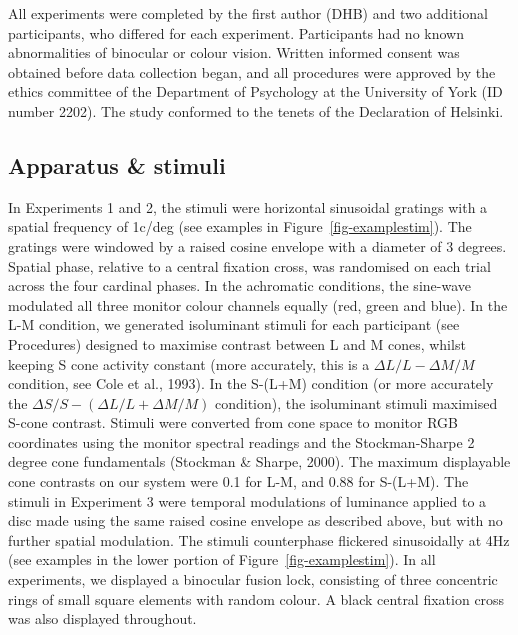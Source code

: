 \documentclass[
  letterpaper,
  DIV=11,
  numbers=noendperiod]{scrartcl}
\begin{document}
All experiments were completed by the first author (DHB) and two
additional participants, who differed for each experiment. Participants
had no known abnormalities of binocular or colour vision. Written
informed consent was obtained before data collection began, and all
procedures were approved by the ethics committee of the Department of
Psychology at the University of York (ID number 2202). The study
conformed to the tenets of the Declaration of Helsinki.

\subsection{Apparatus \& stimuli}\label{apparatus-stimuli}

In Experiments 1 and 2, the stimuli were horizontal sinusoidal gratings
with a spatial frequency of 1c/deg (see examples in
Figure~\ref{fig-examplestim}). The gratings were windowed by a raised
cosine envelope with a diameter of 3 degrees. Spatial phase, relative to
a central fixation cross, was randomised on each trial across the four
cardinal phases. In the achromatic conditions, the sine-wave modulated
all three monitor colour channels equally (red, green and blue). In the
L-M condition, we generated isoluminant stimuli for each participant
(see Procedures) designed to maximise contrast between L and M cones,
whilst keeping S cone activity constant (more accurately, this is a
\(\Delta L/L - \Delta M/M\) condition, see Cole et al., 1993). In the
S-(L+M) condition (or more accurately the
\(\Delta S/S - (\Delta L/L + \Delta M/M)\) condition), the isoluminant
stimuli maximised S-cone contrast. Stimuli were converted from cone
space to monitor RGB coordinates using the monitor spectral readings and
the Stockman-Sharpe 2 degree cone fundamentals (Stockman \& Sharpe,
2000). The maximum displayable cone contrasts on our system were 0.1 for
L-M, and 0.88 for S-(L+M). The stimuli in Experiment 3 were temporal
modulations of luminance applied to a disc made using the same raised
cosine envelope as described above, but with no further spatial
modulation. The stimuli counterphase flickered sinusoidally at 4Hz (see
examples in the lower portion of Figure~\ref{fig-examplestim}). In all
experiments, we displayed a binocular fusion lock, consisting of three
concentric rings of small square elements with random colour. A black
central fixation cross was also displayed throughout.
\end{document}
